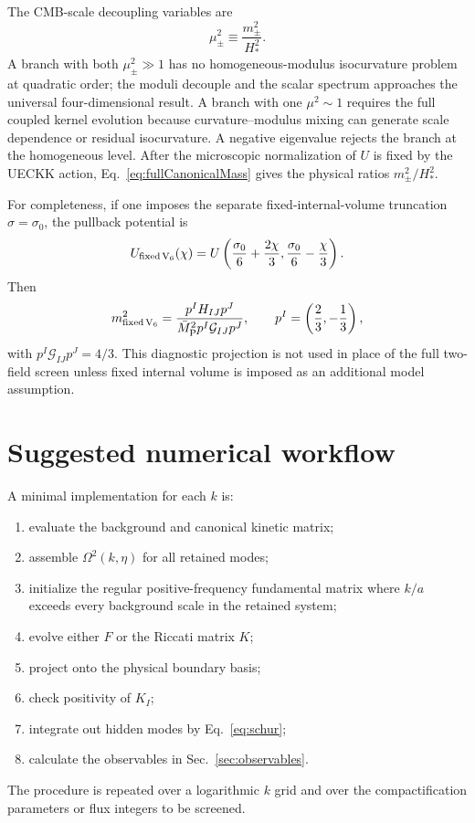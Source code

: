 \documentclass[aps,prd,twocolumn,superscriptaddress,nofootinbib,longbibliography]{revtex4-2}
\newcommand{\Mpl}{\bar M_{\rm P}}
\begin{document}
The CMB-scale decoupling variables are
\begin{equation}
\mu_\pm^2\equiv\frac{m_\pm^2}{H_*^2}.
\end{equation}
A branch with both $\mu_\pm^2\gg1$ has no homogeneous-modulus isocurvature problem at quadratic order; the moduli decouple and the scalar spectrum approaches the universal four-dimensional result. A branch with one $\mu^2\sim1$ requires the full coupled kernel evolution because curvature--modulus mixing can generate scale dependence or residual isocurvature. A negative eigenvalue rejects the branch at the homogeneous level. After the microscopic normalization of $U$ is fixed by the UECKK action, Eq.~\eqref{eq:fullCanonicalMass} gives the physical ratios $m_\pm^2/H_*^2$.

For completeness, if one imposes the separate fixed-internal-volume truncation $\sigma=\sigma_0$, the pullback potential is
\begin{equation}
U_{\rm fixed\,V_6}(\chi)=U\left(\frac{\sigma_0}{6}+\frac{2\chi}{3},
\frac{\sigma_0}{6}-\frac{\chi}{3}\right).
\end{equation}
Then
\begin{equation}
 m_{\rm fixed\,V_6}^2
 =\frac{p^I H_{IJ}p^J}{\Mpl^2 p^I\mathcal G_{IJ}p^J},
\qquad
p^I=\left(\frac23,-\frac13\right),
\end{equation}
with $p^I\mathcal G_{IJ}p^J=4/3$. This diagnostic projection is not used in place of the full two-field screen unless fixed internal volume is imposed as an additional model assumption.

\section{Suggested numerical workflow}
A minimal implementation for each $k$ is:
\begin{enumerate}
\item evaluate the background and canonical kinetic matrix;
\item assemble $\Omega^2(k,\eta)$ for all retained modes;
\item initialize the regular positive-frequency fundamental matrix where $k/a$ exceeds every background scale in the retained system;
\item evolve either $F$ or the Riccati matrix $K$;
\item project onto the physical boundary basis;
\item check positivity of $K_I$;
\item integrate out hidden modes by Eq.~\eqref{eq:schur};
\item calculate the observables in Sec.~\ref{sec:observables}.
\end{enumerate}
The procedure is repeated over a logarithmic $k$ grid and over the compactification parameters or flux integers to be screened.



\end{document}
